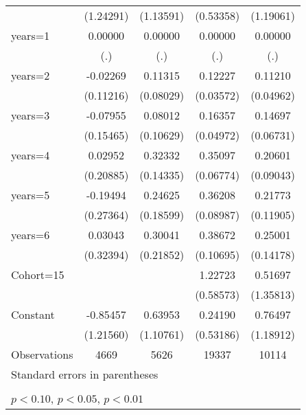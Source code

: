 \begin{table}[htbp]
\begin{tabular}{l*{4}{c}}
                    &   (1.24291)         &   (1.13591)         &   (0.53358)         &   (1.19061)         \\
\addlinespace
years=1             &     0.00000         &     0.00000         &     0.00000         &     0.00000         \\
                    &         (.)         &         (.)         &         (.)         &         (.)         \\
\addlinespace
years=2             &    -0.02269         &     0.11315         &     0.12227\sym{***}&     0.11210\sym{**} \\
                    &   (0.11216)         &   (0.08029)         &   (0.03572)         &   (0.04962)         \\
\addlinespace
years=3             &    -0.07955         &     0.08012         &     0.16357\sym{***}&     0.14697\sym{**} \\
                    &   (0.15465)         &   (0.10629)         &   (0.04972)         &   (0.06731)         \\
\addlinespace
years=4             &     0.02952         &     0.32332\sym{**} &     0.35097\sym{***}&     0.20601\sym{**} \\
                    &   (0.20885)         &   (0.14335)         &   (0.06774)         &   (0.09043)         \\
\addlinespace
years=5             &    -0.19494         &     0.24625         &     0.36208\sym{***}&     0.21773\sym{*}  \\
                    &   (0.27364)         &   (0.18599)         &   (0.08987)         &   (0.11905)         \\
\addlinespace
years=6             &     0.03043         &     0.30041         &     0.38672\sym{***}&     0.25001\sym{*}  \\
                    &   (0.32394)         &   (0.21852)         &   (0.10695)         &   (0.14178)         \\
\addlinespace
Cohort=15           &                     &                     &     1.22723\sym{**} &     0.51697         \\
                    &                     &                     &   (0.58573)         &   (1.35813)         \\
\addlinespace
Constant            &    -0.85457         &     0.63953         &     0.24190         &     0.76497         \\
                    &   (1.21560)         &   (1.10761)         &   (0.53186)         &   (1.18912)         \\
\midrule
Observations        &        4669         &        5626         &       19337         &       10114         \\
\bottomrule
\multicolumn{5}{l}{\footnotesize Standard errors in parentheses}\\
\multicolumn{5}{l}{\footnotesize }\\
\multicolumn{5}{l}{\footnotesize \sym{*} \(p<0.10\), \sym{**} \(p<0.05\), \sym{***} \(p<0.01\)}\\
\end{tabular}
\end{table}
